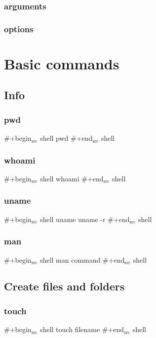 \documentclass[11pt]{article}
\begin{document}
\subsubsection{arguments}
\label{sec:orgheadline9}

\subsubsection{options}
\label{sec:orgheadline10}



\section{Basic commands}
\label{sec:orgheadline36}


\subsection{Info}
\label{sec:orgheadline17}

\subsubsection{pwd}
\label{sec:orgheadline13}
\#+begin\(_{\text{src}}\) shell
pwd
\#+end\(_{\text{src}}\) shell

\subsubsection{whoami}
\label{sec:orgheadline14}
\#+begin\(_{\text{src}}\) shell
whoami
\#+end\(_{\text{src}}\) shell

\subsubsection{uname}
\label{sec:orgheadline15}
\#+begin\(_{\text{src}}\) shell
uname
uname -r
\#+end\(_{\text{src}}\) shell

\subsubsection{man}
\label{sec:orgheadline16}
\#+begin\(_{\text{src}}\) shell
man command
\#+end\(_{\text{src}}\) shell


\subsection{Create files and folders}
\label{sec:orgheadline20}

\subsubsection{touch}
\label{sec:orgheadline18}
\#+begin\(_{\text{src}}\) shell
touch filename
\#+end\(_{\text{src}}\) shell
\end{document}
